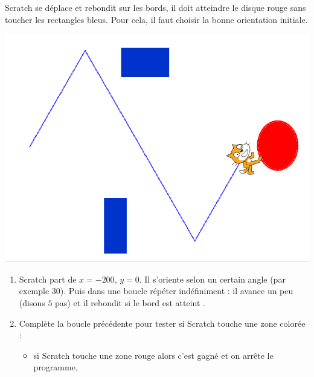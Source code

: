 \documentclass[class=report,crop=false, 12pt]{standalone}
\begin{document}




\bigskip
\bigskip

\begin{activite}

Scratch se déplace et rebondit sur les bords, il doit atteindre le disque rouge sans toucher les rectangles bleus. Pour cela, il faut choisir la bonne orientation initiale.

\begin{center}
  \includegraphics[scale=\scaleecran]{ecran-04-ex1} 
\end{center}

\begin{enumerate}
  \item Scratch part de $x=-200$, $y=0$. Il s'oriente selon un certain angle (par exemple $30$\textdegree). Puis dans une boucle \og répéter indéfiniment \fg{} : il avance un peu (disons $5$ pas) et il \og rebondit si le bord est atteint \fg{}.
  
  
  \item Complète la boucle précédente pour tester si Scratch touche une zone colorée :
  \begin{itemize}
    \item si Scratch touche une zone rouge alors c'est gagné et on arrête le programme,
    

\end{itemize}
\end{enumerate}
\end{activite}
\end{document}
